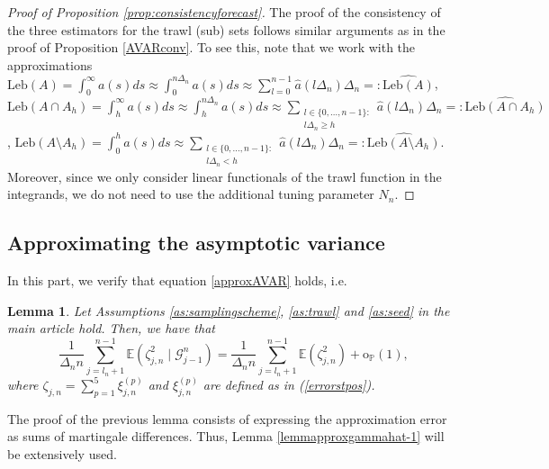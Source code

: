 \documentclass{article}
\theoremstyle{plain}
\newtheorem{lemma}{Lemma}
\theoremstyle{definition}
\theoremstyle{remark}
\newcommand{\Leb}{\ensuremath{\mathrm{Leb}}}
\begin{document}
\begin{appendix}
\begin{proof}[Proof of Proposition \ref{prop:consistencyforecast}]
The proof of the consistency of the three estimators for the trawl (sub) sets follows similar arguments as in the proof of Proposition 
	\ref{AVARconv}. To see this, note that we work with the approximations
	$\Leb(A)=\int_0^{\infty}a(s)ds\approx\int_0^{n\Delta_n}a(s)ds\approx 
	\sum_{l=0}^{n-1}\hat a(l\Delta_n)\Delta_n=:\widehat{\Leb(A)}$,%
	$\Leb(A\cap A_h)= \int_h^{\infty}a(s)ds\approx\int_h^{n\Delta_n}a(s)ds\approx 
	\sum_{\substack{l\in \{0, \ldots, n-1\}:\\ l\Delta_n \geq h}} \hat a(l\Delta_n)\Delta_n=:\widehat{	\Leb(A\cap A_h)}$,
	$\Leb(A\setminus A_h)= \int_0^{h}a(s)ds\approx 
	\sum_{\substack{l\in \{0, \ldots, n-1\}:\\ l\Delta_n < h}} \hat a(l\Delta_n)\Delta_n=:\widehat{\Leb(A\setminus A_h)}$.
	Moreover, since we only consider linear functionals of the trawl function in the integrands, we do not need to use the additional tuning parameter $N_n$.\end{proof}


\subsection{Approximating the asymptotic variance}

In this part, we verify that equation \eqref{approxAVAR} holds, i.e.
\begin{lemma}\label{lemmaavar}Let Assumptions \ref{as:samplingscheme},
	\ref{as:trawl} and \ref{as:seed} in  the main article hold. 
	Then, we have that 
	\[
	\frac{1}{\Delta_{n}n}\sum_{j=l_{n}+1}^{n-1}\mathbb{E}(\zeta_{j,n}^{2}\mid\mathscr{G}_{j-1}^{n})=\frac{1}{\Delta_{n}n}\sum_{j=l_{n}+1}^{n-1}\mathbb{E}(\zeta_{j,n}^{2})+\mathrm{o}_{\mathbb{P}}(1),
	\]
	where $\zeta_{j,n}=\sum_{p=1}^{5}\xi_{j,n}^{(p)}$ and $\xi_{j,n}^{(p)}$ are defined as in (\ref{errorstpos}). 
	
\end{lemma}

The proof of the previous lemma consists of expressing the approximation error as sums of martingale differences. Thus, Lemma \ref{lemmapproxgammahat-1} will be extensively used.



\end{appendix}
\end{document}
